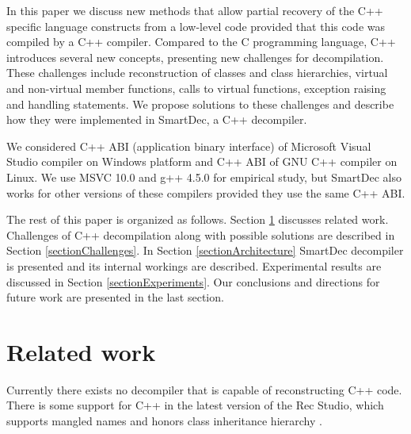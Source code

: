 \documentclass[10pt, conference, compsocconf]{IEEEtran}
\newcommand{\compact}{}
\newcommand{\skipspace}{}
\newcommand{\skipsectionspace}{}
\begin{document}
In this paper we discuss new methods that allow partial
recovery of the C++ specific language constructs from a low-level
code provided that this code was compiled by a C++ compiler.
Compared to the C programming language, C++ introduces several new concepts,
presenting new challenges for decompilation. 
These challenges include reconstruction of classes and class hierarchies,
virtual and non-virtual member functions, calls to virtual functions,
exception raising and handling statements.
We propose solutions to these challenges and describe how they were 
implemented in SmartDec, a C++ decompiler.

We considered C++ ABI
(application binary interface) of Microsoft Visual Studio
compiler on Windows platform and C++ ABI
of GNU C++ compiler on Linux. We use MSVC 10.0 and g++ 4.5.0
for empirical study, but SmartDec also works for
other versions of these compilers provided they use the same C++ ABI.



The rest of this paper is organized as follows. 
Section \ref{sectionRelatedWork} discusses related work.
Challenges of C++ decompilation along with possible solutions are
described in Section \ref{sectionChallenges}.
In Section \ref{sectionArchitecture} SmartDec decompiler is 
presented and its internal workings are described.
Experimental results are discussed in Section \ref{sectionExperiments}.
Our conclusions and directions for future work are
presented in the last section.




\section{Related work}\label{sectionRelatedWork}\skipsectionspace
Currently there exists no decompiler that is capable of reconstructing C++ code. 
There is some support for C++ in the latest version of the
Rec Studio, which supports mangled names and honors class inheritance hierarchy \cite{rec}.
\end{document}

